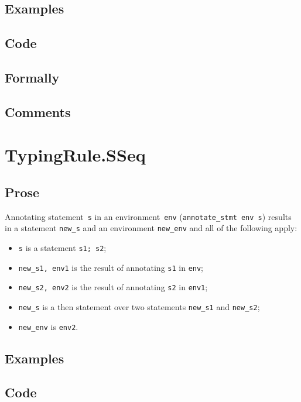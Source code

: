 \documentclass{book}
\begin{document}
  \subsection{Examples}

  \subsection{Code}

  \subsection{Formally}

  \subsection{Comments}

\section{TypingRule.SSeq \label{sec:TypingRule.SSeq}}

  \subsection{Prose}
Annotating statement~\texttt{s} in an environment~\texttt{env}
(\texttt{annotate\_stmt env s}) results in a statement \texttt{new\_s} and an
environment \texttt{new\_env} and all of the following apply:
   \begin{itemize}
   \item \texttt{s} is a statement \texttt{s1; s2};
   \item \texttt{new\_s1, env1} is the result of annotating \texttt{s1} in \texttt{env};
   \item \texttt{new\_s2, env2} is the result of annotating \texttt{s2} in \texttt{env1};
   \item \texttt{new\_s} is a then statement over two statements \texttt{new\_s1} and \texttt{new\_s2};
   \item \texttt{new\_env} is \texttt{env2}.
   \end{itemize}

  \subsection{Examples}

  \subsection{Code}
\end{document}
